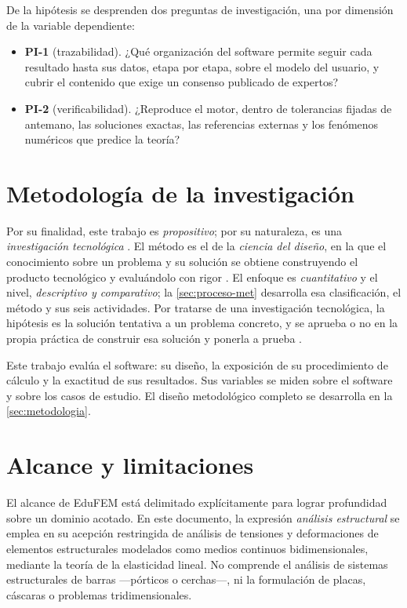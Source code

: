 De la hipótesis se desprenden dos preguntas de investigación, una por dimensión de la variable dependiente:
\begin{itemize}
    \item \textbf{PI-1} (trazabilidad). ¿Qué organización del software permite seguir cada resultado hasta sus datos, etapa por etapa, sobre el modelo del usuario, y cubrir el contenido que exige un consenso publicado de expertos?
    \item \textbf{PI-2} (verificabilidad). ¿Reproduce el motor, dentro de tolerancias fijadas de antemano, las soluciones exactas, las referencias externas y los fenómenos numéricos que predice la teoría?
\end{itemize}

\section*{Metodología de la investigación}

Por su finalidad, este trabajo es \emph{propositivo}; por su naturaleza, es una \emph{investigación tecnológica} \autocite[p.~91]{garciacordoba2005tecnologica}. El método es el de la \emph{ciencia del diseño}, en la que el conocimiento sobre un problema y su solución se obtiene construyendo el producto tecnológico y evaluándolo con rigor \autocite[pp.~75, 83]{hevner2004design}. El enfoque es \emph{cuantitativo} y el nivel, \emph{descriptivo y comparativo}; la \autoref{sec:proceso-met} desarrolla esa clasificación, el método y sus seis actividades. Por tratarse de una investigación tecnológica, la hipótesis es la solución tentativa a un problema concreto, y se aprueba o no en la propia práctica de construir esa solución y ponerla a prueba \autocite[p.~85]{garciacordoba2005tecnologica}.

Este trabajo evalúa el software: su diseño, la exposición de su procedimiento de cálculo y la exactitud de sus resultados. Sus variables se miden sobre el software y sobre los casos de estudio. El diseño metodológico completo se desarrolla en la \autoref{sec:metodologia}.

\section*{Alcance y limitaciones}

El alcance de EduFEM está delimitado explícitamente para lograr profundidad sobre un dominio acotado. En este documento, la expresión \emph{análisis estructural} se emplea en su acepción restringida de análisis de tensiones y deformaciones de elementos estructurales modelados como medios continuos bidimensionales, mediante la teoría de la elasticidad lineal. No comprende el análisis de sistemas estructurales de barras —pórticos o cerchas—, ni la formulación de placas, cáscaras o problemas tridimensionales.

